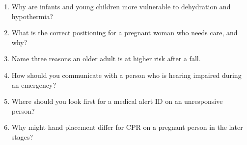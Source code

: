 \begin{enumerate}[leftmargin=*]
\item Why are infants and young children more vulnerable to dehydration and hypothermia?
\item What is the correct positioning for a pregnant woman who needs care, and why?
\item Name three reasons an older adult is at higher risk after a fall.
\item How should you communicate with a person who is hearing impaired during an emergency?
\item Where should you look first for a medical alert ID on an unresponsive person?
\item Why might hand placement differ for CPR on a pregnant person in the later stages?
\end{enumerate}

